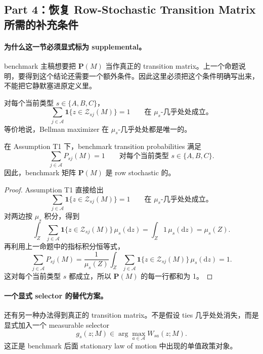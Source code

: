 \subsection{Part 4：恢复 Row-Stochastic Transition Matrix 所需的补充条件}

\paragraph{为什么这一节必须显式标为 supplemental。}
benchmark 主稿想要把 $\mathbf P(M)$ 当作真正的 transition matrix。上一个命题说明，要得到这个结论还需要一个额外条件。因此这里必须把这个条件明确写出来，不能把它静默塞进原定义里。

\begin{assumption}
对每个当前类型 $s\in\{A,B,C\}$，
\[
\sum_{j\in\mathcal A}\mathbf 1\{z\in\mathcal Z_{sj}(M)\}=1
\qquad\text{在 }\mu_s\text{-几乎处处成立。}
\]
等价地说，Bellman maximizer 在 $\mu_s$-几乎处处都是唯一的。
\end{assumption}

\begin{proposition}
在 Assumption T1 下，benchmark transition probabilities 满足
\[
\sum_{j\in\mathcal A}P_{sj}(M)=1
\qquad\text{对每个当前类型 }s\in\{A,B,C\}.
\]
因此，benchmark 矩阵 $\mathbf P(M)$ 是 row stochastic 的。
\end{proposition}

\begin{proof}
Assumption T1 直接给出
\[
\sum_{j\in\mathcal A}\mathbf 1\{z\in\mathcal Z_{sj}(M)\}=1
\qquad\text{在 }\mu_s\text{-几乎处处成立。}
\]
对两边按 $\mu_s$ 积分，得到
\[
\int_Z\sum_{j\in\mathcal A}\mathbf 1\{z\in\mathcal Z_{sj}(M)\}\,\mu_s(\mathrm{d} z)
=
\int_Z 1\,\mu_s(\mathrm{d} z)
=
\mu_s(Z).
\]
再利用上一命题中的指标积分恒等式，
\[
\sum_{j\in\mathcal A}P_{sj}(M)
=
\frac{1}{\mu_s(Z)}
\int_Z\sum_{j\in\mathcal A}\mathbf 1\{z\in\mathcal Z_{sj}(M)\}\,\mu_s(\mathrm{d} z)
=1.
\]
这对每个当前类型 $s$ 都成立，所以 $\mathbf P(M)$ 的每一行都和为 1。
\end{proof}

\paragraph{一个显式 selector 的替代方案。}
还有另一种办法得到真正的 transition matrix。不是假设 ties 几乎处处消失，而是显式加入一个 measurable selector
\[
g_s(z;M)\in\arg\max_{a\in\mathcal A}W_{sa}(z;M).
\]
这正是 benchmark 后面 stationary law of motion 中出现的单值政策对象。

